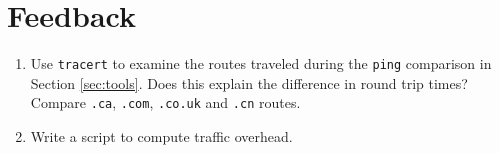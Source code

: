 \section{Feedback}\label{sec:feedback}
\begin{enumerate}
	\item Use \texttt{tracert} to examine the routes traveled during the \texttt{ping} comparison in Section \ref{sec:tools}. Does this explain the difference in round trip times? Compare \texttt{.ca}, \texttt{.com}, \texttt{.co.uk} and \texttt{.cn} routes.
	\item Write a script to compute traffic overhead.
\end{enumerate}

